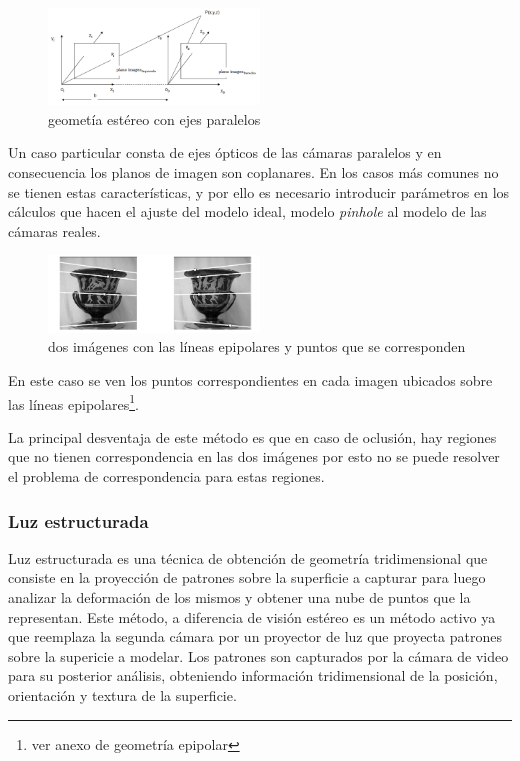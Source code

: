 \begin{figure}[H]
  \centering
    \includegraphics[width=0.5\textwidth]{./Cap2_videomapping/stereo.PNG}
  \caption[Structure from Stereo- A Review  Umesh R. Dhond and J.K.Aggarwal 1989]{geometía estéreo con ejes paralelos}
  \label{fig:Stereo}
\end{figure}
Un caso particular consta de ejes ópticos de las cámaras paralelos y en consecuencia los planos de imagen son coplanares. En los casos más comunes no se tienen estas características, y por ello es necesario introducir parámetros en los cálculos que hacen el ajuste del modelo ideal, modelo \emph{pinhole} al modelo de las cámaras reales. 

\begin{figure}[H]
  \centering
    \includegraphics[width=0.5\textwidth]{./Cap2_videomapping/epipolar3.PNG}
  \caption{dos imágenes con las líneas epipolares y puntos que se corresponden}%
  \label{fig:Stereo2}
\end{figure}
En este caso se ven los puntos correspondientes en cada imagen ubicados sobre las líneas epipolares\footnote{ver anexo de geometría epipolar}.

La principal desventaja de este método es que en caso de oclusión, hay regiones que no tienen correspondencia en las dos imágenes por esto no se puede resolver el problema de correspondencia para estas regiones.

\subsubsection{Luz estructurada}

Luz estructurada es una técnica de obtención de geometría tridimensional que consiste en la proyección de patrones sobre la superficie a capturar para luego analizar la deformación de los mismos y obtener una nube de puntos que la representan. Este método, a diferencia de visión estéreo es un método activo ya que reemplaza la segunda cámara por un proyector de luz que proyecta patrones sobre la supericie a modelar.
Los patrones son capturados por la cámara de video para su posterior análisis, obteniendo información tridimensional de la posición, orientación y textura de la superficie\cite{SLightPatterns}.

